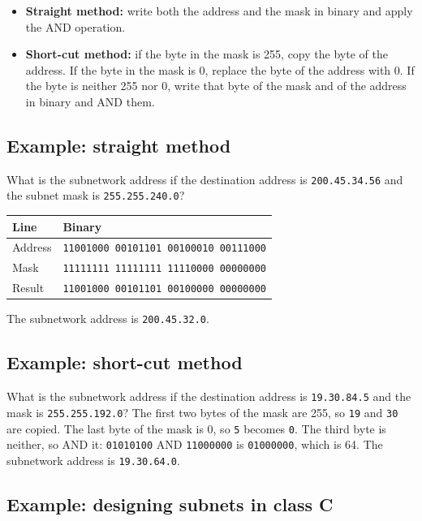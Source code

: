 \documentclass[11pt,a4paper]{article}
\begin{document}
\begin{itemize}\itemsep3pt
  \item \textbf{Straight method:} write both the address and the mask in binary and apply the
        AND operation.
  \item \textbf{Short-cut method:} if the byte in the mask is 255, copy the byte of the
        address. If the byte in the mask is 0, replace the byte of the address with 0. If the
        byte is neither 255 nor 0, write that byte of the mask and of the address in binary
        and AND them.
\end{itemize}

\subsection*{Example: straight method}

What is the subnetwork address if the destination address is \texttt{200.45.34.56} and the
subnet mask is \texttt{255.255.240.0}?

\begin{tabularx}{\textwidth}{@{}lX@{}}
\toprule
\rowcolor{tablehead}\textbf{Line} & \textbf{Binary} \\
\midrule
Address & \texttt{11001000 00101101 00100010 00111000} \\
Mask & \texttt{11111111 11111111 11110000 00000000} \\
Result & \texttt{11001000 00101101 00100000 00000000} \\
\bottomrule
\end{tabularx}

The subnetwork address is \texttt{200.45.32.0}.

\subsection*{Example: short-cut method}

What is the subnetwork address if the destination address is \texttt{19.30.84.5} and the mask
is \texttt{255.255.192.0}? The first two bytes of the mask are 255, so \texttt{19} and
\texttt{30} are copied. The last byte of the mask is 0, so \texttt{5} becomes \texttt{0}. The
third byte is neither, so AND it: \texttt{01010100} AND \texttt{11000000} is
\texttt{01000000}, which is 64. The subnetwork address is \texttt{19.30.64.0}.

\subsection*{Example: designing subnets in class C}
\end{document}
